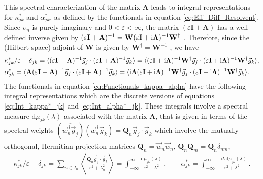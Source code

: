 \documentclass[11pt]{amsart}
\newcommand{\I}{\mathrm{i}}
\renewcommand{\d}{\mathrm{d}}
\newcommand{\Ib}{\mathbf{I}}
\newcommand{\Ab}{\mathbf{A}}
\newcommand{\Qb}{\mathbf{Q}}
\newcommand{\Wb}{\mathbf{W}}
\newcommand\bLambda{\mbox{\boldmath${\Lambda}$}}
\begin{document}
This spectral characterization of the matrix $\Ab$ leads to integral
representations for $\kappa_{jk}^*$ and $\alpha_{jk}^*$, as defined by the
functionals in equation \eqref{eq:Eff_Diff_Resolvent}. Since $\upsilon_n$ is
purely imaginary and $0<\varepsilon<\infty$, the matrix $(\varepsilon\Ib+\Ab)$ has a well defined
inverse given by
$(\varepsilon\Ib+\Ab)^{-1}=\Wb(\varepsilon\Ib+\I\bLambda)^{-1}\Wb^\dagger$
\cite{Horn_Johnson-1990}. Therefore, since the (Hilbert space) adjoint
of $\Wb$ is given by $\Wb^\dagger=\Wb^{-1}$
\cite{Horn_Johnson-1990,Keener-2000}, we have  
% 
\begin{align}\label{eq:Functionals_kappa_alpha}
  &\kappa^*_{jk}/\varepsilon-\delta_{jk}=\langle(\varepsilon\Ib+\Ab)^{-1}\vec{g}_j\cdot(\varepsilon\Ib+\Ab)^{-1}\vec{g}_k\rangle 
=\langle(\varepsilon\Ib+\I\bLambda)^{-1}\Wb^\dagger\vec{g}_j\cdot(\varepsilon\Ib+\I\bLambda)^{-1}\Wb^\dagger\vec{g}_k\rangle ,
\\
&\alpha^*_{jk}=\langle\Ab(\varepsilon\Ib+\Ab)^{-1}\vec{g}_j\cdot(\varepsilon\Ib+\Ab)^{-1}\vec{g}_k\rangle
=\langle\I\bLambda(\varepsilon\Ib+\I\bLambda)^{-1}\Wb^\dagger\vec{g}_j\cdot(\varepsilon\Ib+\I\bLambda)^{-1}\Wb^\dagger\vec{g}_k\rangle. 
\notag
\end{align}
%
The functionals in equation \eqref{eq:Functionals_kappa_alpha} have the
following integral representations which are the discrete versions of
equations \eqref{eq:Int_kappa*_jk} and \eqref{eq:Int_alpha*_jk}. These
integrals involve a spectral measure $\d\mu_{jk}(\lambda)$
associated with the matrix $\Ab$, that is given in terms of the
spectral weights
$(\overline{\vec{w}_n^{\,\dagger}\vec{g}_j})(\vec{w}_n^{\,\dagger}\vec{g}_k)=\Qb_n\vec{g}_j\cdot\vec{g}_k$
which involve the mutually orthogonal, Hermitian projection matrices 
$\Qb_n=\vec{w}_n\vec{w}_n^{\,\dagger}$, $\Qb_n\Qb_m=\Qb_n\delta_{nm}$,     
%
\begin{align}\label{eq:Integral_Rep_Discrete}
  \kappa^*_{jk}/\varepsilon-\delta_{jk}
 =\sum_{n\in I_n} 
 \left\langle\frac{\Qb_n\vec{g}_j\cdot\vec{g}_k}{\varepsilon^2+\lambda_n^2}\right\rangle
 =\int_{-\infty}^\infty\frac{\d\mu_{jk}(\lambda)}{\varepsilon^2+\lambda^2}\,,
 \qquad 
 \alpha^*_{jk}
 =\int_{-\infty}^\infty\frac{-\I\lambda\,\d\mu_{jk}(\lambda)}{\varepsilon^2+\lambda^2}\,.
\end{align}
\end{document}
